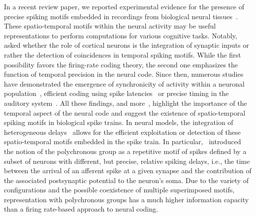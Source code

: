 \documentclass[default]{sn-jnl}%
\theoremstyle{thmstyleone}%
\theoremstyle{thmstyletwo}%
\theoremstyle{thmstylethree}%
\begin{document}
In a recent review paper, we reported experimental evidence for the presence of precise spiking motifs embedded in recordings from biological neural tissues~\cite{grimaldi_precise_2023}. These spatio-temporal motifs within the neural activity may be useful representations to perform computations for various cognitive tasks. Notably, \citet{abeles_role_1982} asked whether the role of cortical neurons is the integration of synaptic inputs or rather the detection of coincidences in temporal spiking motifs. While the first possibility favors the firing-rate coding theory, the second one emphasizes the function of temporal precision in the neural code. Since then, numerous studies have demonstrated the emergence of synchronicity of activity within a neuronal population~\citep{riehle_spike_1997, davis_spontaneous_2021}, efficient coding using spike latencies~\citep{perrinet_coding_2004, gollisch_rapid_2008} or precise timing in the auditory system~\citep{deweese_binary_2002, carr_circuit_1990}. All these findings, and more~\citep{bohte_evidence_2004}, highlight the importance of the temporal aspect of the neural code and suggest the existence of spatio-temporal spiking motifs in biological spike trains. In neural models, the integration of heterogeneous delays~\citep{guise_bayesian_2014, zhang_supervised_2020, nadafian_bio-plausible_2020} allows for the efficient exploitation or detection of these spatio-temporal motifs embedded in the spike train. In particular,~\citet{izhikevich_polychronization_2006} introduced the notion of the polychronous group as a repetitive motif of spikes defined by a subset of neurons with different, but precise, relative spiking delays, i.e., the time between the arrival of an afferent spike at a given synapse and the contribution of the associated postsynaptic potential to the neuron's soma. Due to the variety of configurations and the possible coexistence of multiple superimposed motifs, representation with polychronous groups has a much higher information capacity than a firing rate-based approach to neural coding.
\end{document}
